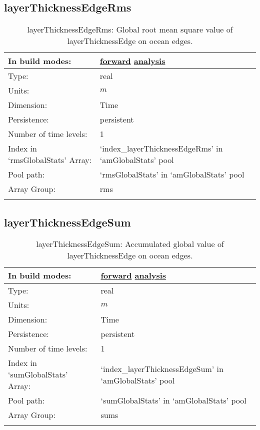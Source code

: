 \subsection[layerThicknessEdgeRms]{layerThicknessEdgeRms}
\label{subsec:var_sec_amGlobalStats_layerThicknessEdgeRms}
\begin{center}
\begin{longtable}{| p{2.0in} | p{4.0in} |}
        \hline 
        In build modes: & \hyperref[subsec:forward_var_tab_amGlobalStats]{forward} \hyperref[subsec:analysis_var_tab_amGlobalStats]{analysis} \\
        \hline 
        Type: & real \\
        \hline 
        Units: & $m$ \\
        \hline 
        Dimension: & Time \\
        \hline 
        Persistence: & persistent \\
        \hline 
        Number of time levels: & 1 \\
        \hline 
		 Index in `rmsGlobalStats' Array: & `index\_layerThicknessEdgeRms' in `amGlobalStats' pool \\
		 \hline 
            Pool path: & `rmsGlobalStats' in `amGlobalStats' pool \\
		 \hline 
		 Array Group: & rms \\
		 \hline 
    \caption{layerThicknessEdgeRms: Global root mean square value of layerThicknessEdge on ocean edges.}
\end{longtable}
\end{center}
\subsection[layerThicknessEdgeSum]{layerThicknessEdgeSum}
\label{subsec:var_sec_amGlobalStats_layerThicknessEdgeSum}
\begin{center}
\begin{longtable}{| p{2.0in} | p{4.0in} |}
        \hline 
        In build modes: & \hyperref[subsec:forward_var_tab_amGlobalStats]{forward} \hyperref[subsec:analysis_var_tab_amGlobalStats]{analysis} \\
        \hline 
        Type: & real \\
        \hline 
        Units: & $m$ \\
        \hline 
        Dimension: & Time \\
        \hline 
        Persistence: & persistent \\
        \hline 
        Number of time levels: & 1 \\
        \hline 
		 Index in `sumGlobalStats' Array: & `index\_layerThicknessEdgeSum' in `amGlobalStats' pool \\
		 \hline 
            Pool path: & `sumGlobalStats' in `amGlobalStats' pool \\
		 \hline 
		 Array Group: & sums \\
		 \hline 
    \caption{layerThicknessEdgeSum: Accumulated global value of layerThicknessEdge on ocean edges.}
\end{longtable}
\end{center}
